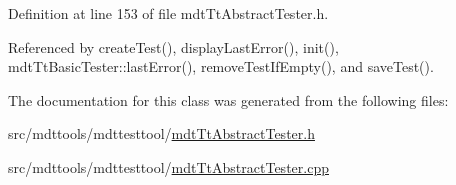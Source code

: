Definition at line 153 of file mdt\-Tt\-Abstract\-Tester.\-h.



Referenced by create\-Test(), display\-Last\-Error(), init(), mdt\-Tt\-Basic\-Tester\-::last\-Error(), remove\-Test\-If\-Empty(), and save\-Test().



The documentation for this class was generated from the following files\-:\begin{DoxyCompactItemize}
\item 
src/mdttools/mdttesttool/\hyperlink{mdt_tt_abstract_tester_8h}{mdt\-Tt\-Abstract\-Tester.\-h}\item 
src/mdttools/mdttesttool/\hyperlink{mdt_tt_abstract_tester_8cpp}{mdt\-Tt\-Abstract\-Tester.\-cpp}\end{DoxyCompactItemize}
